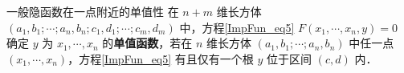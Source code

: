 \begin{definition}{一般隐函数在一点附近的单值性}
在 $n+m$ 维长方体 $(a_1,b_1;\cdots;a_n,b_n;c_1,d_1;\cdots;c_m,d_m)$ 中，方程\autoref{ImpFun_eq5} $F(x_1,\cdots,x_n,y)=0$ 确定 $y$ 为 $x_1,\cdots,x_n$ 的\textbf{单值函数}，若在 $n$ 维长方体 $(a_1,b_1;\cdots;a_n,b_n)$ 中任一点 $(x_1,\cdots,x_n)$，方程\autoref{ImpFun_eq5} 有且仅有一个根 $y$ 位于区间 $(c,d)$ 内．
\end{definition}